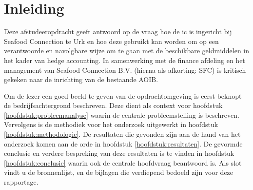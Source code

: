 \chapter*{Inleiding} %
Deze afstudeeropdracht geeft antwoord op de vraag hoe de \gls{ic} is ingericht bij Seafood Connection te Urk en hoe deze gebruikt kan worden om op een verantwoorde en navolgbare wijze om te gaan met de beschikbare geldmiddelen in het kader van hedge accounting. In samenwerking met de finance afdeling en het management van Seafood Connection B.V. (hierna als afkorting: SFC) is kritisch gekeken naar de inrichting van de bestaande AOIB. 

Om de lezer een goed beeld te geven van de opdrachtomgeving is eerst beknopt de bedrijfsachtergrond beschreven. 
Deze dient als context voor hoofdstuk \ref{hoofdstuk:probleemanalyse} waarin de centrale probleemstelling is beschreven. Vervolgens is de methodiek voor het onderzoek uitgewerkt in hoofdstuk \ref{hoofdstuk:methodologie}. De resultaten die gevonden zijn aan de hand van het onderzoek komen aan de orde in hoofdstuk \ref{hoofdstuk:resultaten}. De gevormde conclusie en verdere bespreking van deze resultaten is te vinden in hoofdstuk \ref{hoofdstuk:conclusie} waarin ook de centrale hoofdvraag beantwoord is. Als slot vindt u de bronnenlijst, en de bijlagen die verdiepend bedoeld zijn voor deze rapportage. 